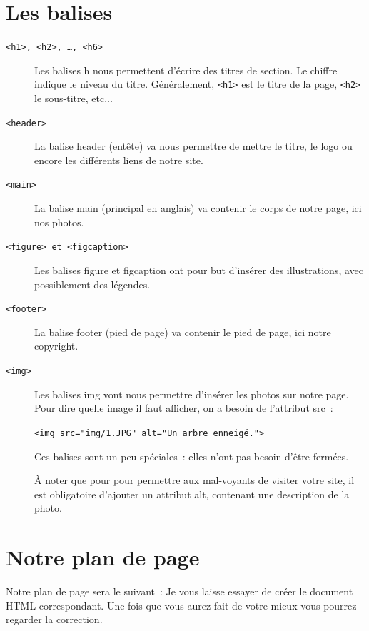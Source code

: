 \section{Les balises}
\begin{description}
	\item[\texttt{<h1>, <h2>, …, <h6>}] Les balises h nous
		permettent d’écrire des titres de section. Le chiffre indique
		le niveau du titre. Généralement, \texttt{<h1>} est
		le titre de la page, \texttt{<h2>} le sous-titre,
		etc...
	\item[\texttt{<header>}] La balise header (entête) va nous
		permettre de mettre le titre, le logo ou encore les différents
		liens de notre site.
	\item[\texttt{<main>}] La balise main (principal en anglais)
		va contenir le corps de notre page, ici nos photos.
	\item[\texttt{<figure> et <figcaption>}] Les balises figure
		et figcaption ont pour but d’insérer des illustrations, avec
		possiblement des légendes.
	\item[\texttt{<footer>}] La balise footer (pied de page) va
		contenir le pied de page, ici notre copyright.
	\item[\texttt{<img>}] Les balises img vont nous permettre
		d’insérer les photos sur notre page. Pour dire quelle image il
		faut afficher, on a besoin de l’attribut src :

		\texttt{<img src="img/1.JPG" alt="Un arbre enneigé.">}

		Ces balises sont un peu spéciales : elles n'ont pas besoin
		d'être fermées.

		À noter que pour pour permettre aux mal-voyants de visiter votre
		site, il est obligatoire d’ajouter un attribut alt, contenant
		une description de la photo.
\end{description}

\section{Notre plan de page}
Notre plan de page sera le suivant :
Je vous laisse essayer de créer le document HTML correspondant. Une fois que
vous aurez fait de votre mieux vous pourrez regarder la correction.

